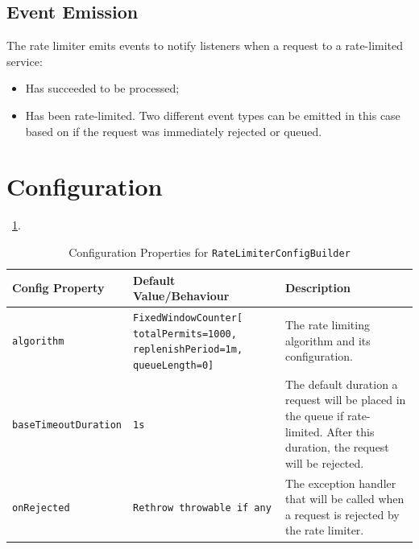 \subsection{Event Emission}\label{subsec:rate-limiter-event-emission}

The rate limiter emits events to notify listeners when a request to a rate-limited service:

\begin{itemize}
    \item Has succeeded to be processed;
    \item Has been rate-limited.
    Two different event types can be emitted in this case based on if the request was immediately rejected or queued.
\end{itemize}


\section{Configuration}\label{sec:rate-limiter-configuration}

~\ref{tab:ratelimiter-config-builder}.

\begin{table}[!htb]
    \centering
    \caption{Configuration Properties for \texttt{RateLimiterConfigBuilder}}
    \label{tab:ratelimiter-config-builder}
    \vspace{0.3cm}
    \begin{tabular}{|p{5cm}|p{5cm}|p{6cm}|}
        \hline
        \textbf{Config Property} & \textbf{Default Value/Behaviour}                                                   & \textbf{Description}                               \\ \hline
        \texttt{algorithm}       & \texttt{FixedWindowCounter[ totalPermits=1000, replenishPeriod=1m, queueLength=0]} & The rate limiting algorithm and its configuration.                                                                                                         \\ \hline
        \texttt{baseTimeoutDuration} & \texttt{1s} & The default duration a request will be placed in the queue
        if rate-limited.
        After this duration, the request will be rejected. \\ \hline
        \texttt{onRejected} & \texttt{Rethrow throwable
        if any} & The exception handler that will be called when a request is rejected by the rate limiter. \\ \hline
    \end{tabular}
\end{table}

